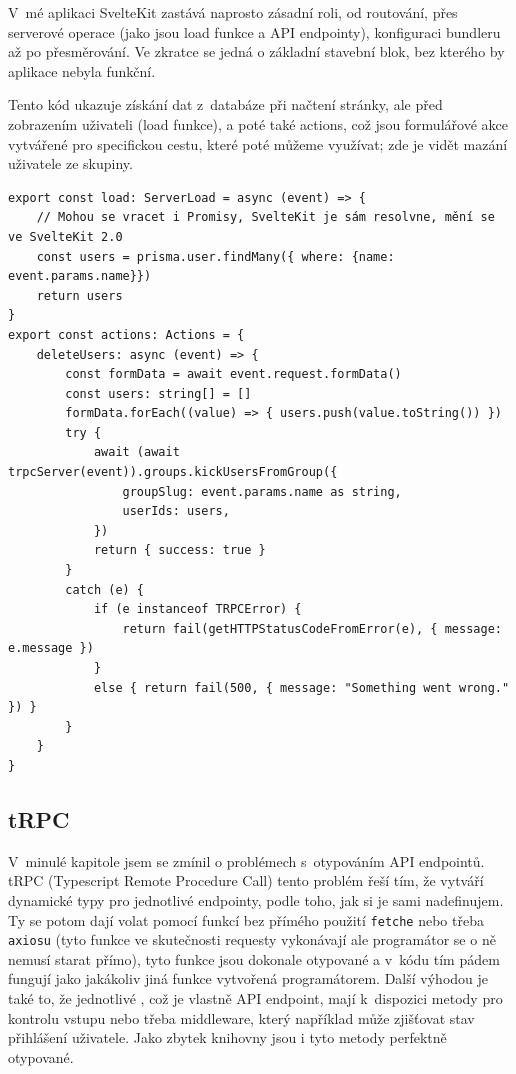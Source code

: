 \documentclass[12pt, a4paper,
openright
]{report}
\begin{document}
V~mé aplikaci SvelteKit zastává naprosto zásadní roli, od routování, přes serverové operace (jako jsou load funkce a API endpointy), konfiguraci bundleru až po přesměrování. Ve zkratce se jedná o základní stavební blok, bez kterého by aplikace nebyla funkční.

Tento kód ukazuje získání dat z~databáze při načtení stránky, ale před zobrazením uživateli (load funkce), a poté také actions, což jsou formulářové akce vytvářené pro specifickou cestu, které poté můžeme využívat; zde je vidět mazání uživatele ze skupiny.
\clearpage
\begin{lstlisting}[style=ES6, caption=Ukázka z +page.server.ts, label=sveltekit_code]
export const load: ServerLoad = async (event) => {
	// Mohou se vracet i Promisy, SvelteKit je sám resolvne, mění se ve SvelteKit 2.0
	const users = prisma.user.findMany({ where: {name: event.params.name}})
	return users
}
export const actions: Actions = {
	deleteUsers: async (event) => {
		const formData = await event.request.formData()
		const users: string[] = []
		formData.forEach((value) => { users.push(value.toString()) })
		try {
			await (await trpcServer(event)).groups.kickUsersFromGroup({
				groupSlug: event.params.name as string,
				userIds: users,
			})
			return { success: true }
		}
		catch (e) {
			if (e instanceof TRPCError) {
				return fail(getHTTPStatusCodeFromError(e), { message: e.message })
			}
			else { return fail(500, { message: "Something went wrong." }) }
		}
	}
}
\end{lstlisting}

\subsection{tRPC}
V~minulé kapitole jsem se zmínil o problémech s~otypováním API endpointů. tRPC (Typescript Remote Procedure Call) tento problém řeší tím, že vytváří dynamické typy pro jednotlivé endpointy, podle toho, jak si je sami nadefinujem. Ty se potom dají volat pomocí funkcí bez přímého použití \texttt{fetche} nebo třeba \texttt{axiosu} (tyto funkce ve skutečnosti  requesty vykonávají ale programátor se o ně nemusí starat přímo), tyto funkce jsou dokonale otypované a v~kódu tím pádem fungují jako jakákoliv jiná funkce vytvořená programátorem. Další výhodou je také to, že jednotlivé , což je vlastně API endpoint, mají k~dispozici metody pro kontrolu vstupu nebo třeba middleware, který například může zjišťovat stav přihlášení uživatele. Jako zbytek knihovny jsou i tyto metody perfektně otypované.
\end{document}
